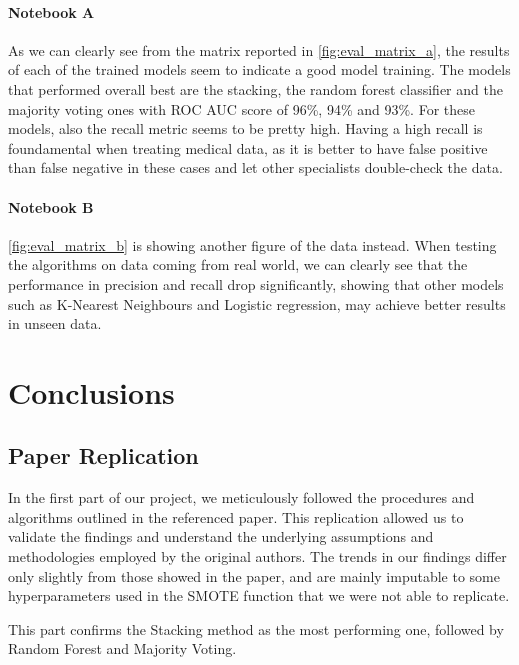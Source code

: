 \documentclass{Configuration_Files/Template}
\begin{document}
\subsubsection{Notebook A}

As we can clearly see from the matrix reported in \ref{fig:eval_matrix_a}, the results of each of the trained models seem to indicate a good model training. The models that performed overall best are the stacking, the random forest classifier and the majority voting ones with ROC AUC score of 96\%, 94\% and 93\%. For these models, also the recall metric seems to be pretty high. Having a high recall is foundamental when treating medical data, as it is better to have false positive than false negative in these cases and let other specialists double-check the data.

\subsubsection{Notebook B}

\ref{fig:eval_matrix_b} is showing another figure of the data instead. When testing the algorithms on data coming from real world, we can clearly see that the performance in precision and recall drop significantly, showing that other models such as K-Nearest Neighbours and Logistic regression, may achieve better results in unseen data.

\chapter{Conclusions}

\section{Paper Replication}
In the first part of our project, we meticulously followed the procedures and algorithms outlined in the referenced paper. This replication allowed us to validate the findings and understand the underlying assumptions and methodologies employed by the original authors. The trends in our findings differ only slightly from those showed in the paper, and are mainly imputable to some hyperparameters used in the SMOTE function that we were not able to replicate.

This part confirms the Stacking method as the most performing one, followed by Random Forest and Majority Voting.
\end{document}
